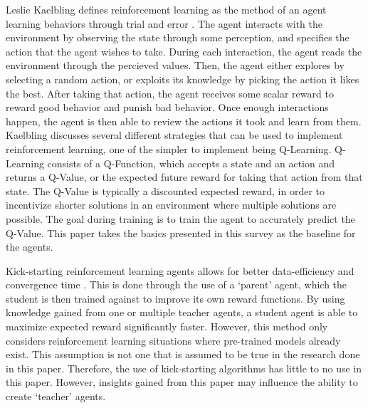 \documentclass[12pt,letterpaper]{article}
\begin{document}
Leslie Kaelbling defines reinforcement learning as the method of an agent learning behaviors through trial and error \cite{article_reinforcement_learning_survey}.
The agent interacts with the environment by observing the state through some perception, and specifies the action that the agent wishes to take.
During each interaction, the agent reads the environment through the percieved values.
Then, the agent either explores by selecting a random action, or exploits its knowledge by picking the action it likes the best.
After taking that action, the agent receives some scalar reward to reward good behavior and punish bad behavior.
Once enough interactions happen, the agent is then able to review the actions it took and learn from them.
Kaelbling discusses several different strategies that can be used to implement reinforcement learning, one of the simpler to implement being Q-Learning.
Q-Learning consists of a Q-Function, which accepts a state and an action and returns a Q-Value, or the expected future reward for taking that action from that state.
The Q-Value is typically a discounted expected reward, in order to incentivize shorter solutions in an environment where multiple solutions are possible.
The goal during training is to train the agent to accurately predict the Q-Value.
This paper takes the basics presented in this survey as the baseline for the agents.

Kick-starting reinforcement learning agents allows for better data-efficiency and convergence time \cite{article_kickstart_deep_reinforcement_learning}.
This is done through the use of a `parent' agent, which the student is then trained against to improve its own reward functions.
By using knowledge gained from one or multiple teacher agents, a student agent is able to maximize expected reward significantly faster.
However, this method only considers reinforcement learning situations where pre-trained models already exist.
This assumption is not one that is assumed to be true in the research done in this paper.
Therefore, the use of kick-starting algorithms has little to no use in this paper.
However, insights gained from this paper may influence the ability to create `teacher' agents.
\end{document}
